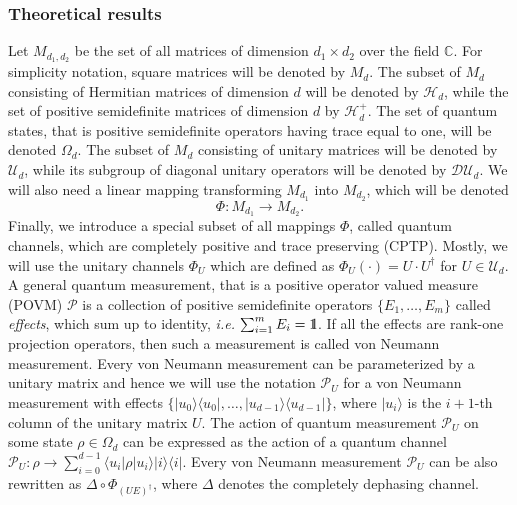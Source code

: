 \documentclass[preprint,12pt, a4paper]{elsarticle}
\newcommand{\ie}{{\emph{i.e.\/}}}
\newcommand{\ket}[1]{\ensuremath{|#1\rangle}}
\newcommand{\bra}[1]{\ensuremath{\langle#1|}}
\newcommand{\ketbra}[2]{\ensuremath{\ket{#1}\bra{#2}}}
\newcommand{\proj}[1]{\ensuremath{\ketbra{#1}{#1}}}
\newcommand{\1}{{\rm 1\hspace{-0.9mm}l}}
\newcommand{\DD}{\mathcal{D}}
\newcommand{\PP}{\mathcal{P}}
\newcommand{\UU}{\mathcal{U}}
\newcommand{\HH}{\mathcal{H}}
\begin{document}
\subsubsection{Theoretical results}



Let $M_{d_1,d_2}$ be the set of all matrices of dimension $d_1 \times d_2$ over
the field $\mathbb{C}$. For  simplicity notation, square matrices will be 
denoted by
$M_d$.  The subset of $M_d$ consisting of Hermitian matrices of dimension $d$ 
will  be  denoted  by $\HH_d$,  while  the  set  of  positive semidefinite 
matrices of dimension $d$ by $\HH_d^+$. The set of quantum states, that is 
positive semidefinite operators having
trace equal to one, will be denoted $\Omega_d$.  The subset of $M_d$ consisting of 
unitary matrices will be denoted by
$\UU_d$, while its subgroup of diagonal unitary operators will be denoted by
$\DD \UU_d$.  We will also need a linear
mapping transforming $M_{d_1}$ into $M_{d_2}$, which will be denoted \begin{equation}
\Phi: M_{d_1 } \rightarrow M_{d_2}.
\end{equation} Finally, we introduce a special subset of all mappings $\Phi$, called quantum channels, which are completely positive
and trace preserving (CPTP).
Mostly, we will use the unitary channels
$\Phi_{U}$ which are defined as $\Phi_U(\cdot) = U \cdot U^\dagger$ for  $U \in 
\UU_d$. A general quantum
measurement, that is a positive operator valued measure (POVM) $\PP$ is a
collection of positive semidefinite operators $\{E_1, \ldots, E_m \}$ called
\emph{effects}, which sum up to identity, \ie $ \, \, \sum_{i=1}^m E_i = \1$. If
all the effects are rank-one projection operators, then such a measurement is
called von Neumann measurement. Every von Neumann measurement can be
parameterized by a unitary matrix and hence we will use the notation $\PP_{U}$
for a von Neumann measurement with effects $\{\proj{u_0}, \ldots, \proj{u_{d-1}}\}$,
where $\ket{u_i}$ is the $i+1$-th column of the unitary matrix $U$. The action of
quantum measurement $\PP_{U}$ on some state $\rho \in \Omega_d$ can be
expressed as the action of a quantum channel
$
\PP_{U} : \rho \rightarrow \sum_{i=0}^{d-1} \bra{u_i} \rho \ket{u_i} \proj{i}.
$ Every von Neumann measurement  $\PP_{U}$ can be also rewritten as $\Delta 
\circ \Phi_{(UE)^\dagger}$, where $\Delta$ denotes the completely dephasing 
channel.  
\end{document}
